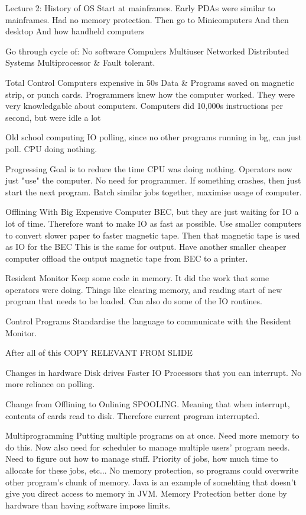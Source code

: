 \documentclass{article}
\begin{document}
Lecture 2:
	History of OS
		Start at mainframes.
			Early PDAs were similar to mainframes. Had no memory protection.
		Then go to Minicomputers
		And then desktop
		And how handheld computers

		Go through cycle of:
			No software
			Compulers
			Multiuser
			Networked
			Distributed Systems
			Multiprocessor & Fault tolerant.

	Total Control
		Computers expensive in 50s
			Data & Programs saved on magnetic strip, or punch cards.
		Programmers knew how the computer worked. They were very knowledgable about computers.
		Computers did 10,000s instructions per second, but were idle a lot

		Old school computing
			IO polling, since no other programs running in bg, can just poll. CPU doing nothing.

		Progressing
			Goal is to reduce the time CPU was doing nothing.
			Operators now just "use" the computer. No need for programmer.
				If something crashes, then just start the next program.
				Batch similar jobs together, maximise usage of computer.

		Offlining
			With Big Expensive Computer BEC, but they are just waiting for IO a lot of time. Therefore want to make IO as fast as possible.
			Use smaller computers to convert slower paper to faster magnetic tape. Then that magnetic tape is used as IO for the BEC
			This is the same for output. Have another smaller cheaper computer offload the output magnetic tape from BEC to a printer.

		Resident Monitor
			Keep some code in memory.
			It did the work that some operators were doing.
				Things like clearing memory, and reading start of new program that needs to be loaded.
				Can also do some of the IO routines.

		Control Programs
			Standardise the language to communicate with the Resident Monitor.

	After all of this
		COPY RELEVANT FROM SLIDE

	Changes in hardware
		Disk drives
			Faster IO
		Processors that you can interrupt.
			No more reliance on polling.

	Change from Offlining to Onlining
		SPOOLING.	
			Meaning that when interrupt, contents of cards read to disk.
			Therefore current program interrupted.

	Multiprogramming
		Putting multiple programs on at once. Need more memory to do this.
		Now also need for scheduler to manage multiple users' program needs.
			Need to figure out how to manage stuff. Priority of jobs, how much time to allocate for these jobs, etc...
		No memory protection, so programs could overwrite other program's chunk of memory.
			Java is an example of somehting that doesn't give you direct access to memory in JVM.
			Memory Protection better done by hardware than having software impose limits. 
\end{document}
